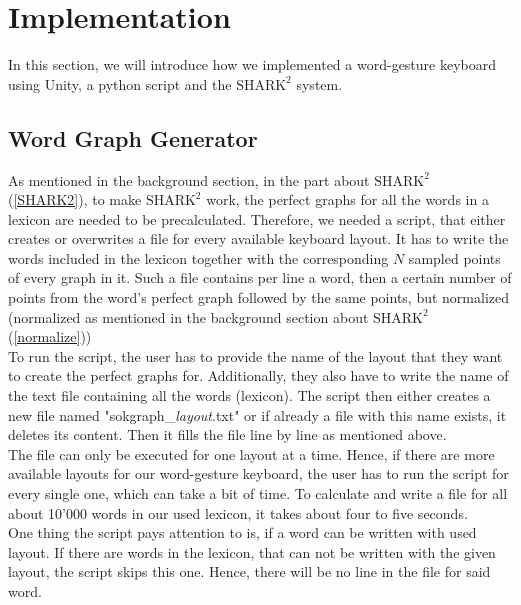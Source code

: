 \chapter{Implementation}

In this section, we will introduce how we implemented a word-gesture keyboard using Unity, a python script and the $\text{SHARK}^2$ system.

\section{Word Graph Generator}
As mentioned in the background section, in the part about $\text{SHARK}^2$ (\ref{SHARK2}), to make $\text{SHARK}^2$ work, the perfect graphs for all the words in a lexicon are needed to be precalculated. Therefore, we needed a script, that either creates or overwrites a file for every available keyboard layout. It has to write the words included in the lexicon together with the corresponding $N$ sampled points of every graph in it. Such a file contains per line a word, then a certain number of points from the word's perfect graph followed by the same points, but normalized (normalized as mentioned in the background section about $\text{SHARK}^2$ (\ref{normalize}))\\
To run the script, the user has to provide the name of the layout that they want to create the perfect graphs for. Additionally, they also have to write the name of the text file containing all the words (lexicon). The script then either creates a new file named "sokgraph\_\textit{layout}.txt" or if already a file with this name exists, it deletes its content. Then it fills the file line by line as mentioned above.\\
The file can only be executed for one layout at a time. Hence, if there are more available layouts for our word-gesture keyboard, the user has to run the script for every single one, which can take a bit of time. To calculate and write a file for all about 10'000 words in our used lexicon, it takes about four to five seconds.\\
One thing the script pays attention to is, if a word can be written with used layout. If there are words in the lexicon, that can not be written with the given layout, the script skips this one. Hence, there will be no line in the file for said word. 

